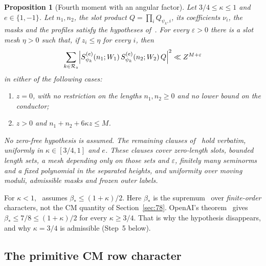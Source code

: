 \documentclass[11pt]{article}
\numberwithin{equation}{section}
\newtheorem{proposition}{Proposition}
\begin{document}
\begin{proposition}[Fourth moment with an angular factor]\label{prop:s5-plain}
Let $3/4\le\kappa\le1$ and $e\in\{1,-1\}$. Let $n_1,n_2$, the slot product $Q=\prod_iQ_{\psi_k,i}$,
its coefficients $\nu_i$, the masks and the profiles satisfy the hypotheses of~\cite[Lemma~18.1]{OAI78}. For every $\varepsilon>0$ there is a slot mesh $\eta>0$ such that, if $z_i\le\eta$
for every $i$, then
\begin{equation}\label{eq:s5-plain-bound}
 \sum_{k\in\mathcal R_z}\Bigl|S^{(e)}_{\psi_k}(n_1;W_1)\,S^{(e)}_{\psi_k}(n_2;W_2)\,Q\Bigr|^2\ll Z^{M+\varepsilon}
\end{equation}
in either of the following cases:
\begin{enumerate}
\item $z=0$, with no restriction on the lengths $n_1,n_2\ge0$ and no lower bound on the conductor;
\item $z>0$ and $n_1+n_2+6\kappa z\le M$.
\end{enumerate}
No zero-free hypothesis is assumed. The remaining clauses of~\cite[Lemma~18.1]{OAI78} hold verbatim, uniformly in $\kappa\in[3/4,1]$ and $e$. These clauses cover zero-length
slots, bounded length sets, a mesh depending only on those sets and $\varepsilon$, finitely many seminorms
and a fixed polynomial in the separated heights, and uniformity over moving moduli, admissible masks and
frozen outer labels.
\end{proposition}

For $\kappa<1$,~\cite[Lemma~18.1]{OAI78} assumes $\beta_*\le(1+\kappa)/2$. Here $\beta_*$ is the
supremum~\cite[eq.~(2.1), Section~2]{OAI78} over \emph{finite-order} characters, not the CM
quantity of Section~\ref{sec:78}. OpenAI's theorem~\cite[Theorem~1.1]{OAI78} gives
$\beta_*\le7/8\le(1+\kappa)/2$ for every $\kappa\ge3/4$. That is why the hypothesis disappears, and why
$\kappa=3/4$ is admissible (Step~5 below).

\subsection{The primitive CM row character}\label{sec:s5-rowchar}
\end{document}
